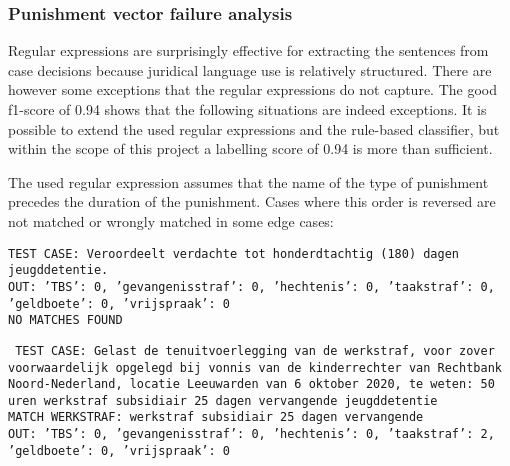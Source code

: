 \documentclass[a4paper]{article}
\begin{document}

\subsubsection{Punishment vector failure analysis}\label{sec:strafmaat_failure_analysis}

Regular expressions are surprisingly effective for extracting the sentences from case decisions because juridical language use is relatively structured.
There are however some exceptions that the regular expressions do not capture.
The good f1-score of 0.94 shows that the following situations are indeed exceptions.
It is possible to extend the used regular expressions and the rule-based classifier, but within the scope of this project a labelling score of 0.94 is more than sufficient.

The used regular expression assumes that the name of the type of punishment precedes the duration of the punishment.
Cases where this order is reversed are not matched or wrongly matched in some edge cases:

\texttt{TEST CASE:
Veroordeelt verdachte tot honderdtachtig (180) dagen jeugddetentie.\\
OUT: {'TBS': 0, 'gevangenisstraf': 0, 'hechtenis': 0, 'taakstraf': 0, 'geldboete': 0, 'vrijspraak': 0}\\
NO MATCHES FOUND
}

\texttt{
TEST CASE: %
Gelast de tenuitvoerlegging van de werkstraf, voor zover voorwaardelijk opgelegd bij vonnis van de kinderrechter van Rechtbank Noord-Nederland, locatie Leeuwarden van 6 oktober 2020, te weten: 50 uren werkstraf subsidiair 25 dagen vervangende jeugddetentie\\
MATCH WERKSTRAF: werkstraf subsidiair 25 dagen vervangende\\
OUT: {'TBS': 0, 'gevangenisstraf': 0, 'hechtenis': 0, 'taakstraf': 2, 'geldboete': 0, 'vrijspraak': 0}\\
}
\end{document}

